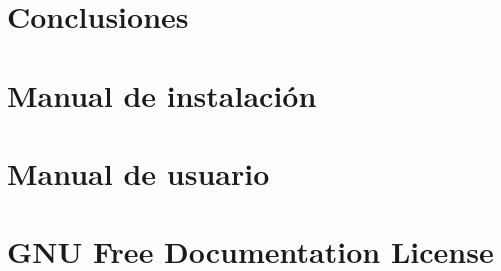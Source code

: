 \documentclass[a4paper,12pt]{scrbook}
\begin{document}
\chapter{Conclusiones}
\label{chap:conclusiones}
%

\appendix

%

\chapter{Manual de instalación}
\label{chap:manual_instalacion}
%

\chapter{Manual de usuario}
\label{chap:manual_usuario}
%

\chapter{GNU Free Documentation License}
\label{sec:fdl}




\end{document}
